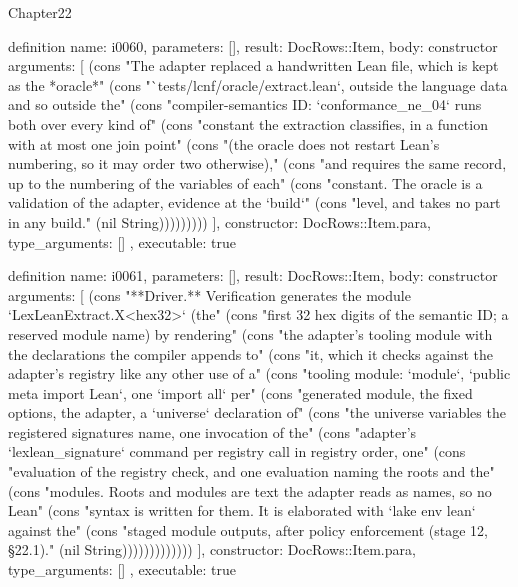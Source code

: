 \begin{lexlean}{Chapter22}
\begin{semanticmodule}
definition{
  name: i0060,
  parameters: [],
  result: DocRows::Item,
  body: constructor{
    arguments: [
      (cons "The adapter replaced a handwritten Lean file, which is kept as the *oracle*" (cons "`tests/lcnf/oracle/extract.lean`, outside the language data and so outside the" (cons "compiler-semantics ID: `conformance_ne_04` runs both over every kind of" (cons "constant the extraction classifies, in a function with at most one join point" (cons "(the oracle does not restart Lean's numbering, so it may order two otherwise)," (cons "and requires the same record, up to the numbering of the variables of each" (cons "constant. The oracle is a validation of the adapter, evidence at the `build`" (cons "level, and takes no part in any build." (nil String)))))))))
    ],
    constructor: DocRows::Item.para,
    type_arguments: []
  },
  executable: true
}

definition{
  name: i0061,
  parameters: [],
  result: DocRows::Item,
  body: constructor{
    arguments: [
      (cons "**Driver.** Verification generates the module `LexLeanExtract.X<hex32>` (the" (cons "first 32 hex digits of the semantic ID; a reserved module name) by rendering" (cons "the adapter's tooling module with the declarations the compiler appends to" (cons "it, which it checks against the adapter's registry like any other use of a" (cons "tooling module: `module`, `public meta import Lean`, one `import all` per" (cons "generated module, the fixed options, the adapter, a `universe` declaration of" (cons "the universe variables the registered signatures name, one invocation of the" (cons "adapter's `lexlean_signature` command per registry call in registry order, one" (cons "evaluation of the registry check, and one evaluation naming the roots and the" (cons "modules. Roots and modules are text the adapter reads as names, so no Lean" (cons "syntax is written for them. It is elaborated with `lake env lean` against the" (cons "staged module outputs, after policy enforcement (stage 12, §22.1)." (nil String)))))))))))))
    ],
    constructor: DocRows::Item.para,
    type_arguments: []
  },
  executable: true
}


\end{semanticmodule}
\end{lexlean}
